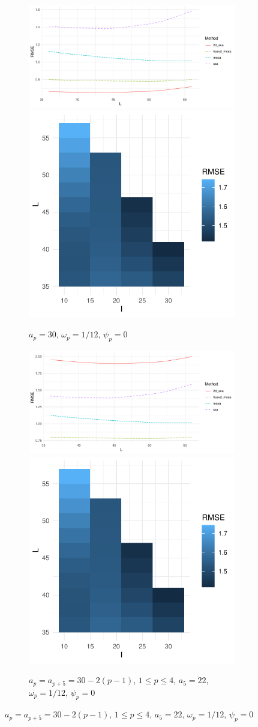 \documentclass[specialist,
  substylefile=spbu.rtx,
subf,href,colorlinks=true, 12pt]{disser}
\theoremstyle{plain}
\theoremstyle{definition}
\theoremstyle{remark}
\begin{document}
\begin{figure}[!h]
  \centering
  \begin{subfigure}{.836\linewidth}
    \includegraphics[width=.66\linewidth]{nine-series-first}\hfill
    \includegraphics[width=.34\linewidth]{nine-series-first_hooi}
    \caption{$a_p = 30$, $\omega_p=1/12$, $\psi_p=0$}
  \end{subfigure} \par\medskip
  \begin{subfigure}{.836\linewidth}
    \includegraphics[width=.66\linewidth]{nine-series-second}\hfill
    \includegraphics[width=.34\linewidth]{nine-series-second_hooi}
    \caption{$a_{p} = a_{p+5} = 30 - 2(p-1)$, $1 \leqslant p \leqslant 4$,
    $a_5=22$, $\omega_p=1/12$, $\psi_p=0$}

\end{subfigure}
\end{figure}
\end{document}
